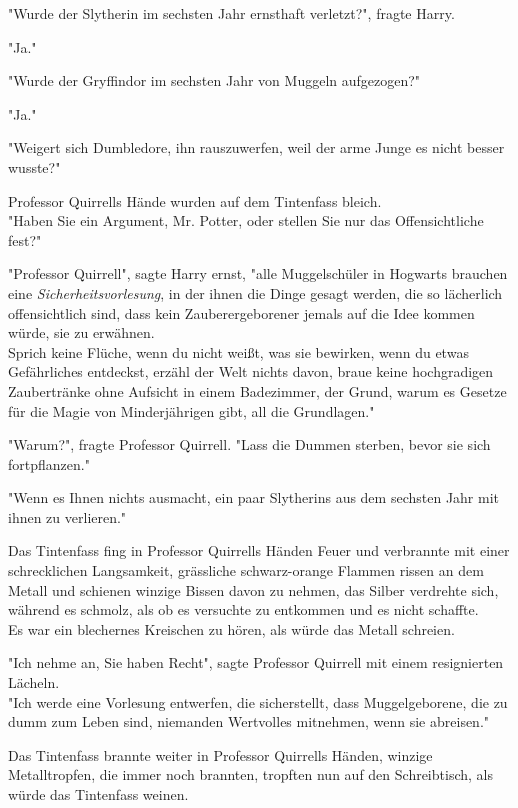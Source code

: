 {"Wurde der Slytherin im sechsten Jahr ernsthaft verletzt?", fragte Harry.

"Ja."

"Wurde der Gryffindor im sechsten Jahr von Muggeln aufgezogen?"

"Ja."

"Weigert sich Dumbledore, ihn rauszuwerfen, weil der arme Junge es nicht besser wusste?"

Professor Quirrells Hände wurden auf dem Tintenfass bleich.\\ "Haben Sie ein Argument, Mr. Potter, oder stellen Sie nur das Offensichtliche fest?"

"Professor Quirrell", sagte Harry ernst, "alle Muggelschüler in Hogwarts brauchen eine \emph{Sicherheitsvorlesung}, in der ihnen die Dinge gesagt werden, die so lächerlich offensichtlich sind, dass kein Zauberergeborener jemals auf die Idee kommen würde, sie zu erwähnen.\\ Sprich keine Flüche, wenn du nicht weißt, was sie bewirken, wenn du etwas Gefährliches entdeckst, erzähl der Welt nichts davon, braue keine hochgradigen Zaubertränke ohne Aufsicht in einem Badezimmer, der Grund, warum es Gesetze für die Magie von Minderjährigen gibt, all die Grundlagen."

"Warum?", fragte Professor Quirrell. "Lass die Dummen sterben, bevor sie sich fortpflanzen."

"Wenn es Ihnen nichts ausmacht, ein paar Slytherins aus dem sechsten Jahr mit ihnen zu verlieren."

Das Tintenfass fing in Professor Quirrells Händen Feuer und verbrannte mit einer schrecklichen Langsamkeit, grässliche schwarz-orange Flammen rissen an dem Metall und schienen winzige Bissen davon zu nehmen, das Silber verdrehte sich, während es schmolz, als ob es versuchte zu entkommen und es nicht schaffte.\\ Es war ein blechernes Kreischen zu hören, als würde das Metall schreien.

"Ich nehme an, Sie haben Recht", sagte Professor Quirrell mit einem resignierten Lächeln.\\ "Ich werde eine Vorlesung entwerfen, die sicherstellt, dass Muggelgeborene, die zu dumm zum Leben sind, niemanden Wertvolles mitnehmen, wenn sie abreisen."

Das Tintenfass brannte weiter in Professor Quirrells Händen, winzige Metalltropfen, die immer noch brannten, tropften nun auf den Schreibtisch, als würde das Tintenfass weinen.

}
